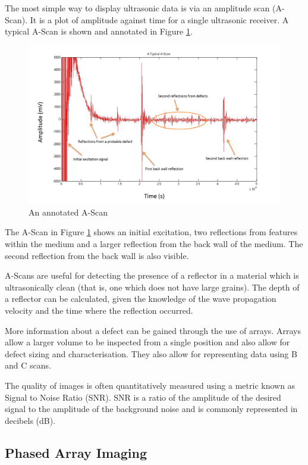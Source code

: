The most simple way to display ultrasonic data is via an amplitude scan (A-Scan). It is a plot of amplitude against time for a single ultrasonic receiver. A typical A-Scan is shown and annotated in Figure \ref{fig:review_ascan}.

\begin{figure}[htbp]
\centering
		\includegraphics[width=\textwidth]{AScan2_axes.png}
		\caption{An annotated A-Scan}
		\label{fig:review_ascan}
\end{figure}

The A-Scan in Figure \ref{fig:review_ascan} shows an initial excitation, two reflections from features within the medium and a larger reflection from the back wall of the medium. The second reflection from the back wall is also visible.

A-Scans are useful for detecting the presence of a reflector in a material which is ultrasonically clean (that is, one which does not have large grains). The depth of a reflector can be calculated, given the knowledge of the wave propagation velocity and the time where the reflection occurred. 

More information about a defect can be gained through the use of arrays. Arrays allow a larger volume to be inspected from a single position and also allow for defect sizing and characterisation. They also allow for representing data using B and C scans.

The quality of images is often quantitatively measured using a metric known as Signal to Noise Ratio (SNR). SNR is a ratio of the amplitude of the desired signal to the amplitude of the background noise and is commonly represented in decibels (dB).

\subsection{Phased Array Imaging}\label{sec:lobes}

